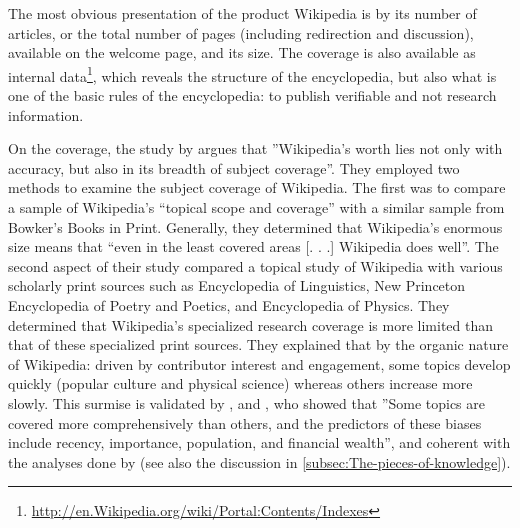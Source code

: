 The most obvious presentation of the product Wikipedia is by its number
of articles, or the total number of pages (including redirection and
discussion), available on the welcome page, and its size. The coverage
is also available as internal data\footnote{\url{http://en.Wikipedia.org/wiki/Portal:Contents/Indexes}},
which reveals the structure of the encyclopedia, but also what is
one of the basic rules of the encyclopedia: to publish verifiable
and not research information.

On the coverage, the study by \citet{HalavaisLackaff08} argues that
''Wikipedia\textquoteright s worth lies not only with accuracy, but
also in its breadth of subject coverage''. They employed two methods
to examine the subject coverage of Wikipedia. The first was to compare
a sample of Wikipedia's \textquotedblleft topical scope and coverage\textquotedblright{}
with a similar sample from Bowker\textquoteright s Books in Print.
Generally, they determined that Wikipedia\textquoteright s enormous
size means that \textquotedblleft even in the least covered areas
{[}. . .{]} Wikipedia does well\textquotedblright . The second aspect
of their study compared a topical study of Wikipedia with various
scholarly print sources such as Encyclopedia of Linguistics, New Princeton
Encyclopedia of Poetry and Poetics, and Encyclopedia of Physics. They
determined that Wikipedia\textquoteright s specialized research coverage
is more limited than that of these specialized print sources. They
explained that by the organic nature of Wikipedia: driven by contributor
interest and engagement, some topics develop quickly (popular culture
and physical science) whereas others increase more slowly. This surmise
is validated by \citet{Denningetal05}, and \citet{RoyalKapila09},
who showed that ''Some topics are covered more comprehensively than
others, and the predictors of these biases include recency, importance,
population, and financial wealth'', and coherent with the analyses
done by \citet{Ibaetal10,KeeganGergleContractor12} (see also the
discussion in \ref{subsec:The-pieces-of-knowledge}).